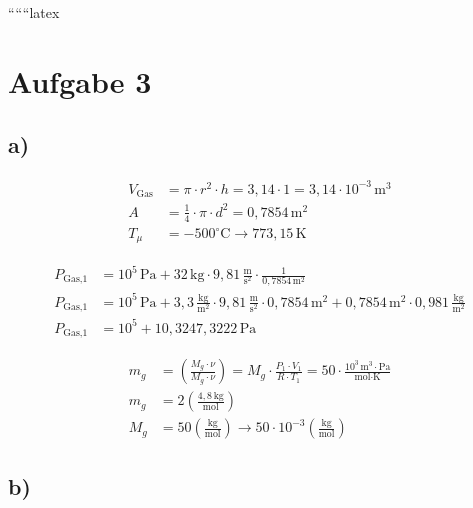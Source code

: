 
``````latex


\section*{Aufgabe 3}

\subsection*{a)}

\begin{align*}
V_{\text{Gas}} &= \pi \cdot r^2 \cdot h = 3,14 \cdot 1 = 3,14 \cdot 10^{-3} \, \text{m}^3 \\
A &= \frac{1}{4} \cdot \pi \cdot d^2 = 0,7854 \, \text{m}^2 \\
T_{\mu} &= -500^\circ \text{C} \rightarrow 773,15 \, \text{K}
\end{align*}

\begin{center}
\end{center}

\begin{align*}
P_{\text{Gas,1}} &= 10^5 \, \text{Pa} + 32 \, \text{kg} \cdot 9,81 \, \frac{\text{m}}{\text{s}^2} \cdot \frac{1}{0,7854 \, \text{m}^2} \\
P_{\text{Gas,1}} &= 10^5 \, \text{Pa} + 3,3 \, \frac{\text{kg}}{\text{m}^2} \cdot 9,81 \, \frac{\text{m}}{\text{s}^2} \cdot 0,7854 \, \text{m}^2 + 0,7854 \, \text{m}^2 \cdot 0,981 \, \frac{\text{kg}}{\text{m}^2} \\
P_{\text{Gas,1}} &= 10^5 + 10,3247,3222 \, \text{Pa}
\end{align*}

\begin{align*}
m_g &= \left( \frac{M_g \cdot \nu}{M_g \cdot \nu} \right) = M_g \cdot \frac{P_1 \cdot V_1}{R \cdot T_1} = 50 \cdot \frac{10^3 \, \text{m}^3 \cdot \text{Pa}}{\text{mol} \cdot \text{K}} \\
m_g &= 2 \left( \frac{4,8 \, \text{kg}}{\text{mol}} \right) \\
M_g &= 50 \left( \frac{\text{kg}}{\text{mol}} \right) \rightarrow 50 \cdot 10^{-3} \left( \frac{\text{kg}}{\text{mol}} \right)
\end{align*}

\subsection*{b)}

